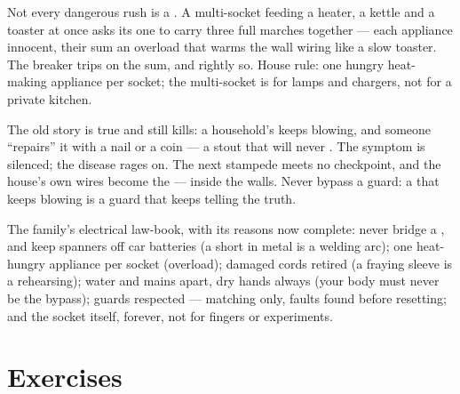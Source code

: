 \begin{example}\label{ex:g7:short-circuits-safety:overload}
Not every dangerous rush is a . A multi-socket
feeding a heater, a kettle and a toaster at once asks its one
 to carry three full marches together --- each appliance
innocent, their sum an overload that warms the wall wiring like
a slow toaster. The breaker trips on the sum, and rightly so.
House rule: one hungry heat-making appliance per socket; the
multi-socket is for lamps and chargers, not for a private
kitchen.
\end{example}

\begin{remark}\label{rem:g7:short-circuits-safety:nail}
The old story is true and still kills: a household's  keeps
blowing, and someone ``repairs'' it with a nail or a coin ---
a stout  that will never . The symptom is silenced;
the disease rages on. The next stampede meets no checkpoint, and
the house's own wires become the  --- inside the walls.
Never bypass a guard: a  that keeps blowing is a guard that
keeps telling the truth.
\end{remark}

\begin{remark}\label{rem:g7:short-circuits-safety:rules}
The family's electrical law-book, with its reasons now complete:
never bridge a  , and keep spanners off car
batteries (a  short in metal is a welding arc); one
heat-hungry appliance per socket (overload); damaged cords
retired (a fraying sleeve is a  rehearsing); water
and mains apart, dry hands always (your body must never be the
bypass); guards respected --- matching  only, faults found
before resetting; and the socket itself, forever, not for
fingers or experiments.
\end{remark}

\section{Exercises}


